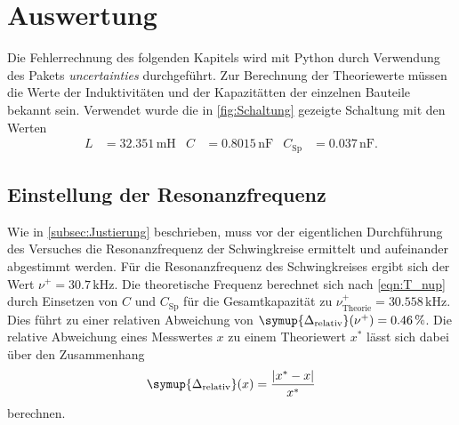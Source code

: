 \section{Auswertung}
\label{sec:Auswertung}
Die Fehlerrechnung des folgenden Kapitels wird mit Python durch Verwendung des Pakets \textit{uncertainties} \cite{uncertainties} durchgeführt.
Zur Berechnung der Theoriewerte müssen die Werte der Induktivitäten und der Kapazitätten der einzelnen Bauteile bekannt sein. Verwendet wurde 
die in \autoref{fig:Schaltung} gezeigte Schaltung mit den Werten 
\begin{align*}
    L &= 32.351 \, \unit{\milli\henry} & C &= 0.8015 \, \unit{\nano\farad} & C_{\text{Sp}} &= 0.037 \, \unit{\nano\farad}.
\end{align*}

\subsection{Einstellung der Resonanzfrequenz}
\label{subsec:A_Resonanz}
Wie in \autoref{subsec:Justierung} beschrieben, muss vor der eigentlichen Durchführung des Versuches die Resonanzfrequenz der Schwingkreise ermittelt und aufeinander abgestimmt 
werden. Für die Resonanzfrequenz des Schwingkreises ergibt sich der Wert $\nu^+ = 30.7 \, \unit{\kilo\hertz}$. Die theoretische Frequenz berechnet sich nach \autoref{eqn:T_nup}
durch Einsetzen von $C$ und $C_\text{Sp}$ für die Gesamtkapazität zu $\nu^+_\text{Theorie} = 30.558 \, \unit{\kilo\hertz}$. Dies führt zu einer relativen Abweichung von 
$\symup{\Delta_\text{relativ}}(\nu^+) = 0.46 \, \%$. Die relative Abweichung eines Messwertes $x$ zu einem Theoriewert $x^*$ lässt sich dabei über den Zusammenhang
\begin{equation}
    \label{eqn:rel_Abw}
    \symup{\Delta_\text{relativ}}(x) = \frac{|x^* - x|}{x^*}
\end{equation}
berechnen.


